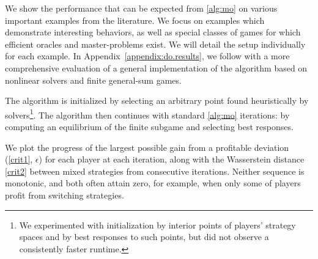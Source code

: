 
We show the performance that can be expected from \cref{alg:mo} on various important examples from the literature. We focus on examples which demonstrate interesting behaviors, as well as special classes of games for which efficient oracles and master-problems exist. We will detail the setup individually for each example. In Appendix~\ref{appendix:do.results}, we follow with a more comprehensive evaluation of a general implementation of the algorithm based on nonlinear solvers and finite general-sum games.

The algorithm is initialized by selecting an arbitrary point found heuristically by solvers\footnote{We experimented with initialization by interior points of players' strategy spaces and by best responses to such points, but did not observe a consistently faster runtime.}. The algorithm then continues with standard \cref{alg:mo} iterations: by computing an equilibrium of the finite subgame and selecting best responses.

We plot the progress of the largest possible gain from a profitable deviation (\ref{crit1}, $\epsilon$) for each player at each iteration, along with the Wasserstein distance \eqref{crit2} between mixed strategies from consecutive iterations. Neither sequence is monotonic, and both often attain zero, for example, when only some of players profit from switching strategies.

